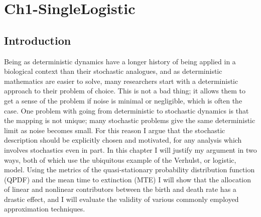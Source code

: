 \chapter{Ch1-SingleLogistic}





\section{Introduction} \label{Introduction}%


Being as deterministic dynamics have a longer history of being applied in a biological context than their stochastic analogues, and as deterministic mathematics are easier to solve, many researchers start with a deterministic approach to their problem of choice. 
This is not a bad thing; it allows them to get a sense of the problem if noise is minimal or negligible, which is often the case. 
One problem with going from deterministic to stochastic dynamics is that the mapping is not unique; many stochastic problems give the same deterministic limit as noise becomes small. 
For this reason I argue that the stochastic description should be explicitly chosen and motivated, for any analysis which involves stochastics even in part. 
In this chapter I will justify my argument in two ways, both of which use the ubiquitous example of the Verhulst, or logistic, model. 
Using the metrics of the quasi-stationary probability distribution function (QPDF) and the mean time to extinction (MTE) I will show that the allocation of linear and nonlinear contributors between the birth and death rate has a drastic effect, and I will evaluate the validity of various commonly employed approximation techniques. 

